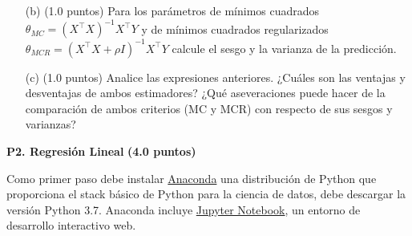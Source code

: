 \documentclass[11pt,letterpaper]{article}
\begin{document}
\begin{itemize}
	\item[(b)] (1.0 puntos) Para los parámetros de mínimos cuadrados $\theta_{MC} = (X^\top X) ^{-1}X^\top Y $  y de  mínimos cuadrados regularizados $\theta_{MCR} = (X^\top X + \rho I) ^{-1}X^\top Y$ calcule el sesgo y la varianza de la predicción.
	\item[(c)] (1.0 puntos) Analice las expresiones anteriores. ¿Cuáles son las ventajas y desventajas de ambos estimadores? ¿Qué aseveraciones  puede hacer de la comparación de ambos criterios (MC y MCR) con respecto de  sus  sesgos y  varianzas?
	
\end{itemize}

\vspace{5 mm}
\noindent\textbf{P2. Regresión Lineal} \textbf{(4.0 puntos)}
\vspace{5 mm}

Como primer paso debe instalar \href{https://www.anaconda.com/distribution/}{Anaconda} una distribución de Python que proporciona el stack básico de Python para la ciencia de datos, debe descargar la versión Python 3.7. Anaconda incluye  \href{https://jupyter.org/}{Jupyter Notebook}, un entorno de desarrollo interactivo web.\\
\end{document}
